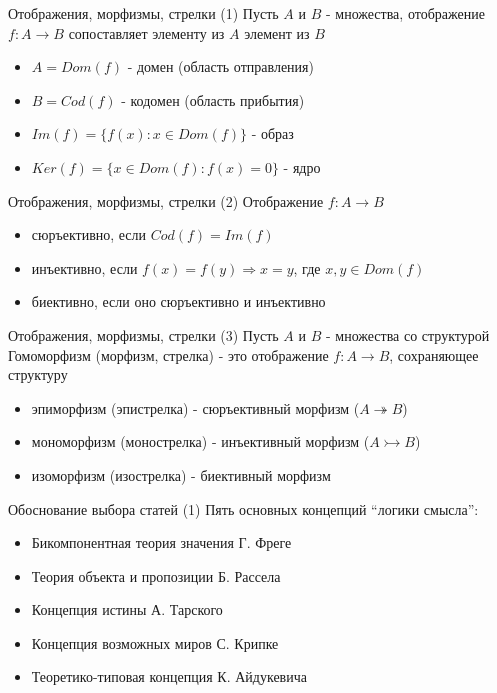 \documentclass{beamer}
\begin{document}
\begin{frame}{Отображения, морфизмы, стрелки (1)}
Пусть $A$ и $B$ - множества, отображение $f : A \to B$ сопоставляет элементу из $A$ элемент из $B$\\
  \begin{itemize}
    \item $A = Dom(f)$ - домен (область отправления)
    \item $B = Cod(f)$ - кодомен (область прибытия) 
    \item $Im(f) = \{f(x) : x \in Dom(f)\}$ - образ 
    \item $Ker(f) = \{x \in Dom(f) : f(x) = 0\}$ - ядро 
  \end{itemize}
\end{frame}

\begin{frame}{Отображения, морфизмы, стрелки (2)}
Отображение $f : A \to B$
  \begin{itemize}
    \item сюръективно, если $Cod(f) = Im(f)$
    \item инъективно, если $f(x) = f(y) \Rightarrow x = y$, где $x, y \in Dom(f)$
    \item биективно, если оно сюръективно и инъективно
  \end{itemize}
\end{frame}

\begin{frame}{Отображения, морфизмы, стрелки (3)}
Пусть $A$ и $B$ - множества со структурой\\ \bigskip
Гомоморфизм (морфизм, стрелка) - это отображение $f : A \to B$, сохраняющее структуру\\
  \begin{itemize}
    \item эпиморфизм (эпистрелка) - сюръективный морфизм ($A \twoheadrightarrow B$)
    \item мономорфизм (монострелка) - инъективный морфизм ($A \rightarrowtail B$)
    \item изоморфизм (изострелка) - биективный морфизм 
  \end{itemize}
\end{frame}


\begin{frame}{Обоснование выбора статей (1)}
Пять основных концепций ``логики смысла'':\\
  \begin{itemize}
    \item Бикомпонентная теория значения Г. Фреге
    \item Теория объекта и пропозиции Б. Рассела
    \item Концепция истины А. Тарского
    \item Концепция возможных миров С. Крипке
    \item Теоретико-типовая концепция К. Айдукевича
  \end{itemize}
\end{frame}
\end{document}
